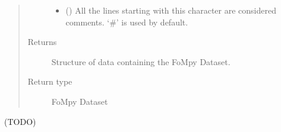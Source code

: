 \documentclass[letterpaper,10pt,english,openany, oneside]{sphinxmanual}
\begin{document}
\begin{fulllineitems}
\begin{quote}
\begin{description}
\begin{itemize}
\item {} 
 () \textendash{} All the lines starting with this character are considered comments.
‘\#’ is used by default.

\end{itemize}

\item[{Returns}] \leavevmode
{} \textendash{} Structure of data containing the FoMpy Dataset.

\item[{Return type}] \leavevmode
FoMpy Dataset

\end{description}\end{quote}

\end{fulllineitems}


\begin{fulllineitems}
\label{\detokenize{index:fompy.fds.daoArray}}
(TODO)

\end{fulllineitems}

\end{document}
